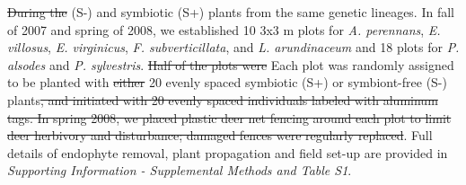 \documentclass[lineno, sn-basic]{sn-jnl}%
\providecommand{\DIFadd}[1]{{\protect\color{blue}#1}} %
\providecommand{\DIFdel}[1]{{\protect\color{red}\protect\scriptsize\sout{#1}}}
\providecommand{\DIFadd}[1]{{\protect\color{blue}\uwave{#1}}} %
\providecommand{\DIFdel}[1]{{\protect\color{red}\sout{#1}}}                      %
\providecommand{\DIFaddbegin}{} %
\providecommand{\DIFaddend}{} %
\providecommand{\DIFdelbegin}{} %
\providecommand{\DIFdelend}{} %
\newcommand{\DIFscaledelfig}{0.5}
\newlength{\DIFdelgraphicswidth} %
\newlength{\DIFdelgraphicsheight} %
\newcommand{\DIFaddincludegraphics}[2][]{{\color{blue}\fbox{\DIFOincludegraphics[#1]{#2}}}} %
\newcommand{\DIFdelincludegraphics}[2][]{%
\sbox{\DIFdelgraphicsbox}{\DIFOincludegraphics[#1]{#2}}%
\settoboxwidth{\DIFdelgraphicswidth}{\DIFdelgraphicsbox} %
\settoboxtotalheight{\DIFdelgraphicsheight}{\DIFdelgraphicsbox} %
\scalebox{\DIFscaledelfig}{%
\parbox[b]{\DIFdelgraphicswidth}{\usebox{\DIFdelgraphicsbox}\\[-\baselineskip] \rule{\DIFdelgraphicswidth}{0em}}\llap{\resizebox{\DIFdelgraphicswidth}{\DIFdelgraphicsheight}{%
\setlength{\unitlength}{\DIFdelgraphicswidth}%
\begin{picture}(1,1)%
\thicklines\linethickness{2pt} %
{\color[rgb]{1,0,0}\put(0,0){\framebox(1,1){}}}%
{\color[rgb]{1,0,0}\put(0,0){\line( 1,1){1}}}%
{\color[rgb]{1,0,0}\put(0,1){\line(1,-1){1}}}%
\end{picture}%
}\hspace*{3pt}}} %
} %
\DeclareRobustCommand{\DIFaddbegin}{\DIFOaddbegin \let\includegraphics\DIFaddincludegraphics} %
\DeclareRobustCommand{\DIFaddend}{\DIFOaddend \let\includegraphics\DIFOincludegraphics} %
\DeclareRobustCommand{\DIFdelbegin}{\DIFOdelbegin \let\includegraphics\DIFdelincludegraphics} %
\DeclareRobustCommand{\DIFdelend}{\DIFOaddend \let\includegraphics\DIFOincludegraphics} %
\begin{document}
\DIFdel{During the }\DIFdelend \DIFaddbegin \DIFadd{(S-) and symbiotic (S+) plants from the same genetic lineages.
In }\DIFaddend fall of 2007 and spring of 2008, we established 10 3x3 m plots for \emph{A. perennans}, \emph{E. villosus}, \emph{E. virginicus}, \emph{F. subverticillata}, and \emph{L. arundinaceum}  and 18 plots for \emph{P. alsodes} and \emph{P. sylvestris}.
\DIFdelbegin \DIFdel{Half of the plots were }\DIFdelend \DIFaddbegin \DIFadd{Each plot was }\DIFaddend randomly assigned to be planted with \DIFdelbegin \DIFdel{either }\DIFdelend \DIFaddbegin \DIFadd{20 evenly spaced }\DIFaddend symbiotic (S+) or symbiont-free (S-) plants\DIFdelbegin \DIFdel{, and initiated with 20 evenly spaced individuals labeled with aluminum tags.
In spring 2008, we placed plastic deer net fencing around each plot to limit deer herbivory and disturbance; damaged fences were regularly replaced}\DIFdelend .
\DIFaddbegin \DIFadd{Full details of endophyte removal, plant propagation and field set-up are provided in }\emph{\DIFadd{Supporting Information - Supplemental Methods and Table S1}}\DIFadd{.
}\DIFaddend 
\end{document}
